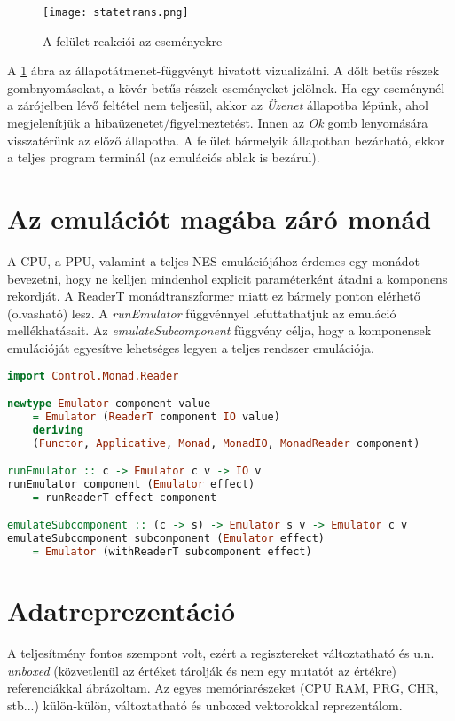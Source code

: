 \begin{figure}[H]
	\centering
	\texttt{[image: statetrans.png]}
	\caption{A felület reakciói az eseményekre}
	\label{fig:states}
\end{figure}

A \ref{fig:states} ábra az állapotátmenet-függvényt hivatott vizualizálni. A dőlt betűs részek gombnyomásokat, a kövér betűs részek eseményeket jelölnek. Ha egy eseménynél a zárójelben lévő feltétel nem teljesül, akkor az \emph{Üzenet} állapotba lépünk, ahol megjelenítjük a hibaüzenetet/figyelmeztetést. Innen az \emph{Ok} gomb lenyomására visszatérünk az előző állapotba. A felület bármelyik állapotban bezárható, ekkor a teljes program terminál (az emulációs ablak is bezárul).

\section{Az emulációt magába záró monád}

A CPU, a PPU, valamint a teljes NES emulációjához érdemes egy monádot bevezetni, hogy ne kelljen mindenhol explicit paraméterként átadni a komponens rekordját. A ReaderT monádtranszformer miatt ez bármely ponton elérhető (olvasható) lesz. A \emph{runEmulator} függvénnyel lefuttathatjuk az emuláció mellékhatásait. Az \emph{emulateSubcomponent} függvény célja, hogy a komponensek emulációját egyesítve lehetséges legyen a teljes rendszer emulációja.

\begin{lstlisting}[language=Haskell]
import Control.Monad.Reader

newtype Emulator component value 
	= Emulator (ReaderT component IO value) 
	deriving 
	(Functor, Applicative, Monad, MonadIO, MonadReader component)

runEmulator :: c -> Emulator c v -> IO v
runEmulator component (Emulator effect) 
	= runReaderT effect component

emulateSubcomponent :: (c -> s) -> Emulator s v -> Emulator c v
emulateSubcomponent subcomponent (Emulator effect) 
	= Emulator (withReaderT subcomponent effect)

\end{lstlisting}

\section{Adatreprezentáció}

A teljesítmény fontos szempont volt, ezért a regisztereket változtatható és u.n. \emph{unboxed} (közvetlenül az értéket tárolják és nem egy mutatót az értékre) referenciákkal ábrázoltam. Az egyes memóriarészeket (CPU RAM, PRG, CHR, stb...) külön-külön, változtatható és unboxed vektorokkal reprezentálom.

